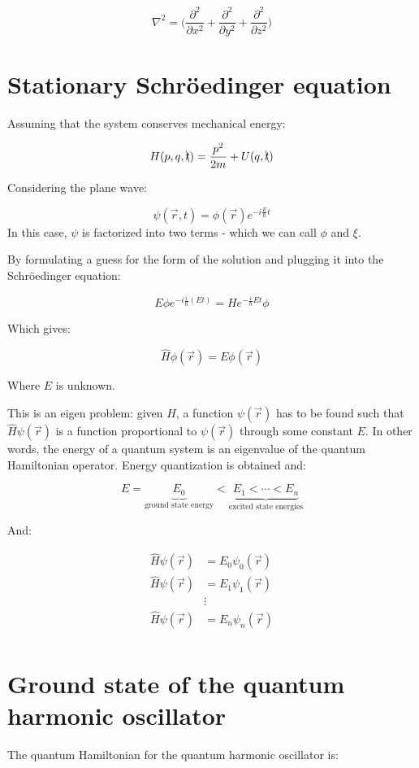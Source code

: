     $$\nabla^2 = \biggl(\frac{\partial^2}{\partial x^2} +\frac{\partial^2}{\partial y^2} + \frac{\partial^2}{\partial z^2}\biggr)$$

\section{Stationary Schr\"oedinger equation}
Assuming that the system conserves mechanical energy:

$$H(p,q, \bcancel{t}) = \frac{p^2}{2m}+U(q,\bcancel{t})$$

Considering the plane wave:

$$\psi(\vec{r}, t) = \phi(\vec{r}) e^{-i \frac{E}{\hbar}t}$$
In this case, $\psi$ is factorized into two terms - which we can call $\phi$ and $\xi$.

By formulating a guess for the form of the solution and plugging it into the Schr\"oedinger equation:

$$E\phi e^{-i \frac{i}{\hbar}(Et)} = He^{-\frac{i}{\hbar}Et}\phi$$

Which gives:

$$\hat{H}\phi(\vec{r}) = E\phi(\vec{r})$$

Where $E$ is unknown.

This is an eigen problem: given $\hat{H}$, a function $\psi(\vec{r})$ has to be found such that $\hat{H}\psi(\vec{r})$ is a function proportional to $\psi(\vec{r})$ through some constant $E$.
In other words, the energy of a quantum system is an eigenvalue of the quantum Hamiltonian operator.
Energy quantization is obtained and:

$$E = \underbrace{E_0}_{\text{ground state energy}} < \underbrace{E_1 < \cdots < E_n}_{\text{excited state energies}}$$

And:

\begin{align*}
  \hat{H}\psi(\vec{r}) &= E_0\psi_0(\vec{r})\\
  \hat{H}\psi(\vec{r}) &= E_1\psi_1(\vec{r})\\
                       &\vdots\\
  \hat{H}\psi(\vec{r}) &= E_n\psi_n(\vec{r})\\
\end{align*}

\section{Ground state of the quantum harmonic oscillator}
The quantum Hamiltonian for the quantum harmonic oscillator is:

